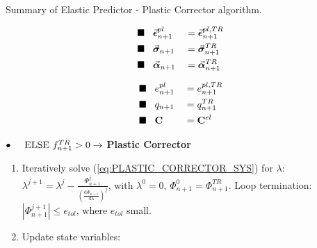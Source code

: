 {\begin{Thesisbox}[label={BoxMaterial}]{Summary of Elastic Predictor - 
		Plastic Corrector algorithm.}
		\vspace{-1.2cm}
		\hspace{-1.03cm}\begin{minipage}[t]{0.6\linewidth}
			\begin{alignat*}{2}
				\blacksquare\hspace{0.3cm}	&\vec{\bm{\epsilon}}^{pl}_{n+1} &&=
				\vec{\bm{\epsilon}}^{pl,TR}_{n+1}\\
				\blacksquare\hspace{0.3cm}	&\vec{\bm{\sigma}}_{n+1}
				&&=\vec{\bm{\sigma}}^{TR}_{n+1}\\
				\blacksquare\hspace{0.3cm}	&\vec{\bm{\alpha}}_{n+1} &&= 
				\vec{\bm{\alpha}}^{TR}_{n+1}
			\end{alignat*}
		\end{minipage}
		\begin{minipage}[t]{0.41\linewidth}
			\begin{alignat*}{2}
				\blacksquare\hspace{0.3cm} &e^{pl}_{n+1} &&= e^{pl,TR}_{n+1}\\
				\blacksquare\hspace{0.3cm}	&q_{n+1} &&= q^{TR}_{n+1}\\
				\blacksquare\hspace{0.3cm}	&\mathbf{C} &&= \mathbf{C}^{el}
			\end{alignat*}
		\end{minipage}
		
		\vspace{0.6cm}
		$\bullet\hspace{0.5cm}\text{ELSE}\ f_{n+1}^{TR}>0\rightarrow$  
		\textbf{Plastic Corrector}
		\begin{enumerate}
			\item Iteratively solve (\ref{eq:PLASTIC_CORRECTOR_SYS}) for 
			$\lambda$:
			$\lambda^{j+1}=\lambda^j-\frac{\Phi_{n+1}^j}{(\frac{\text{d}\Phi_{n+1}}{\text{d}\lambda})^j}$,
			with $\lambda^0 = 0$, $\Phi_{n+1}^0 = \Phi_{n+1}^{TR}$. Loop 
			termination:
			$|\Phi_{n+1}^{j+1}|\leq e_{tol}$, where $e_{tol}$ small.
			\item Update state variables:
			

\end{enumerate}
\end{Thesisbox}}
